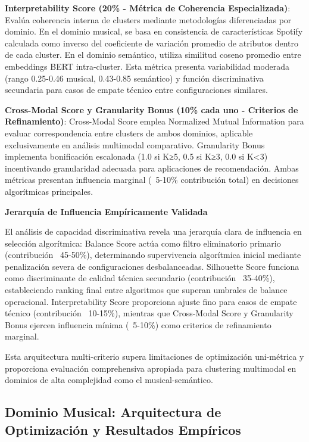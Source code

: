 \documentclass[12pt,a4paper]{report}
\begin{document}
\textbf{Interpretability Score (20\% - Métrica de Coherencia Especializada)}: Evalúa coherencia interna de clusters mediante metodologías diferenciadas por dominio. En el dominio musical, se basa en consistencia de características Spotify calculada como inverso del coeficiente de variación promedio de atributos dentro de cada cluster. En el dominio semántico, utiliza similitud coseno promedio entre embeddings BERT intra-cluster. Esta métrica presenta variabilidad moderada (rango 0.25-0.46 musical, 0.43-0.85 semántico) y función discriminativa secundaria para casos de empate técnico entre configuraciones similares.

\textbf{Cross-Modal Score y Granularity Bonus (10\% cada uno - Criterios de Refinamiento)}: Cross-Modal Score emplea Normalized Mutual Information para evaluar correspondencia entre clusters de ambos dominios, aplicable exclusivamente en análisis multimodal comparativo. Granularity Bonus implementa bonificación escalonada (1.0 si K≥5, 0.5 si K≥3, 0.0 si K<3) incentivando granularidad adecuada para aplicaciones de recomendación. Ambas métricas presentan influencia marginal (~5-10\% contribución total) en decisiones algorítmicas principales.

\textbf{Jerarquía de Influencia Empíricamente Validada}

El análisis de capacidad discriminativa revela una jerarquía clara de influencia en selección algorítmica: Balance Score actúa como filtro eliminatorio primario (contribución ~45-50\%), determinando supervivencia algorítmica inicial mediante penalización severa de configuraciones desbalanceadas. Silhouette Score funciona como discriminante de calidad técnica secundario (contribución ~35-40\%), estableciendo ranking final entre algoritmos que superan umbrales de balance operacional. Interpretability Score proporciona ajuste fino para casos de empate técnico (contribución ~10-15\%), mientras que Cross-Modal Score y Granularity Bonus ejercen influencia mínima (~5-10\%) como criterios de refinamiento marginal.

Esta arquitectura multi-criterio supera limitaciones de optimización uni-métrica y proporciona evaluación comprehensiva apropiada para clustering multimodal en dominios de alta complejidad como el musical-semántico.

\subsection{Dominio Musical: Arquitectura de Optimización y Resultados Empíricos}
\end{document}
